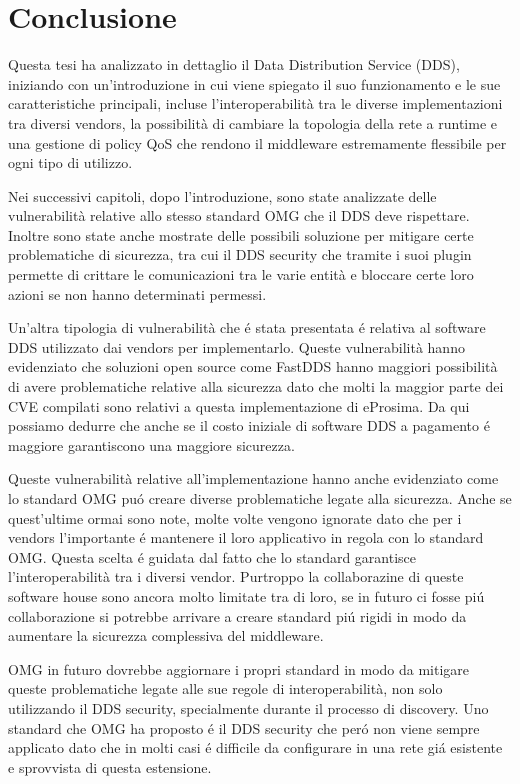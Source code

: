 \chapter{Conclusione}
Questa tesi ha analizzato in dettaglio il Data Distribution Service (DDS),
iniziando con un'introduzione in cui viene spiegato il suo funzionamento 
e le sue caratteristiche principali, incluse l'interoperabilità tra 
le diverse implementazioni tra diversi vendors, la possibilità di 
cambiare la topologia della rete a runtime e una gestione di policy 
QoS che rendono il middleware estremamente flessibile per ogni tipo 
di utilizzo. 

Nei successivi capitoli, dopo l'introduzione, sono state 
analizzate 
delle vulnerabilità relative allo stesso standard OMG che il 
DDS deve rispettare. Inoltre sono state anche mostrate delle
possibili soluzione per mitigare certe problematiche di
sicurezza, tra cui il DDS security che tramite i suoi plugin 
permette di crittare le comunicazioni tra le varie entità e 
bloccare certe loro azioni se non hanno determinati permessi.

Un'altra tipologia di vulnerabilità che é stata presentata é 
relativa al software DDS utilizzato dai vendors per 
implementarlo. Queste vulnerabilità hanno evidenziato che 
soluzioni open source come FastDDS hanno maggiori possibilità 
di avere problematiche relative alla sicurezza dato che molti 
la maggior parte dei CVE compilati sono relativi a questa 
implementazione di eProsima. Da qui possiamo dedurre che 
anche se il costo iniziale di software DDS a pagamento 
é maggiore garantiscono una maggiore sicurezza.

Queste vulnerabilità relative all'implementazione hanno anche
evidenziato 
come lo standard OMG puó creare diverse problematiche 
legate alla sicurezza. 
Anche se quest'ultime ormai sono note, molte volte vengono ignorate 
dato che per i vendors l'importante é mantenere il loro applicativo 
in regola con lo standard OMG. Questa scelta é guidata dal fatto che 
lo standard garantisce l'interoperabilità tra i diversi vendor. 
Purtroppo la collaborazine di queste software house sono ancora 
molto limitate tra di loro, se in futuro ci fosse piú collaborazione 
si potrebbe arrivare a creare standard piú rigidi in modo 
da aumentare la sicurezza complessiva del middleware.

OMG in futuro dovrebbe aggiornare i propri standard in modo da 
mitigare queste problematiche legate alle sue regole di interoperabilità, 
non solo utilizzando il DDS security, specialmente durante il 
processo di discovery. Uno standard che OMG ha proposto 
é il DDS security che peró 
non viene sempre applicato dato che in molti casi é difficile da 
configurare in una rete giá esistente e sprovvista di questa estensione.

